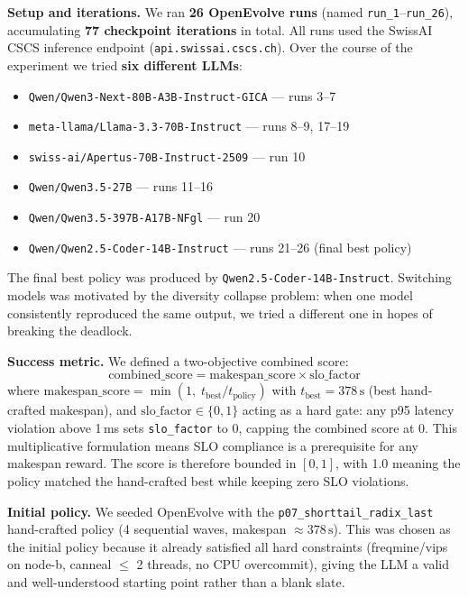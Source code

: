 \begin{enumerate}
\begin{enumerate}
\noindent\textbf{Setup and iterations.}
We ran \textbf{26 OpenEvolve runs} (named \texttt{run\_1}--\texttt{run\_26}), accumulating \textbf{77 checkpoint iterations} in total. All runs used the SwissAI CSCS inference endpoint (\texttt{api.swissai.cscs.ch}). Over the course of the experiment we tried \textbf{six different LLMs}:
\begin{itemize}
  \item \texttt{Qwen/Qwen3-Next-80B-A3B-Instruct-GICA} --- runs 3--7
  \item \texttt{meta-llama/Llama-3.3-70B-Instruct} --- runs 8--9, 17--19
  \item \texttt{swiss-ai/Apertus-70B-Instruct-2509} --- run 10
  \item \texttt{Qwen/Qwen3.5-27B} --- runs 11--16
  \item \texttt{Qwen/Qwen3.5-397B-A17B-NFgl} --- run 20
  \item \texttt{Qwen/Qwen2.5-Coder-14B-Instruct} --- runs 21--26 (final best policy)
\end{itemize}
The final best policy was produced by \texttt{Qwen2.5-Coder-14B-Instruct}. Switching models was motivated by the diversity collapse problem: when one model consistently reproduced the same output, we tried a different one in hopes of breaking the deadlock.

\medskip
\noindent\textbf{Success metric.}
We defined a two-objective combined score:
\[
  \text{combined\_score} = \text{makespan\_score} \times \text{slo\_factor}
\]
where $\text{makespan\_score} = \min(1,\; t_{\text{best}} / t_{\text{policy}})$ with $t_{\text{best}} = 378\,\text{s}$ (best hand-crafted makespan), and $\text{slo\_factor} \in \{0, 1\}$ acting as a hard gate: any p95 latency violation above 1\,ms sets \texttt{slo\_factor} to 0, capping the combined score at 0.  This multiplicative formulation means SLO compliance is a prerequisite for any makespan reward. The score is therefore bounded in $[0, 1]$, with 1.0 meaning the policy matched the hand-crafted best while keeping zero SLO violations.

\medskip
\noindent\textbf{Initial policy.}
We seeded OpenEvolve with the \texttt{p07\_shorttail\_radix\_last} hand-crafted policy (4 sequential waves, makespan $\approx 378\,\text{s}$). This was chosen as the initial policy because it already satisfied all hard constraints (freqmine/vips on node-b, canneal $\le$ 2 threads, no CPU overcommit), giving the LLM a valid and well-understood starting point rather than a blank slate.


\end{enumerate}
\end{enumerate}
